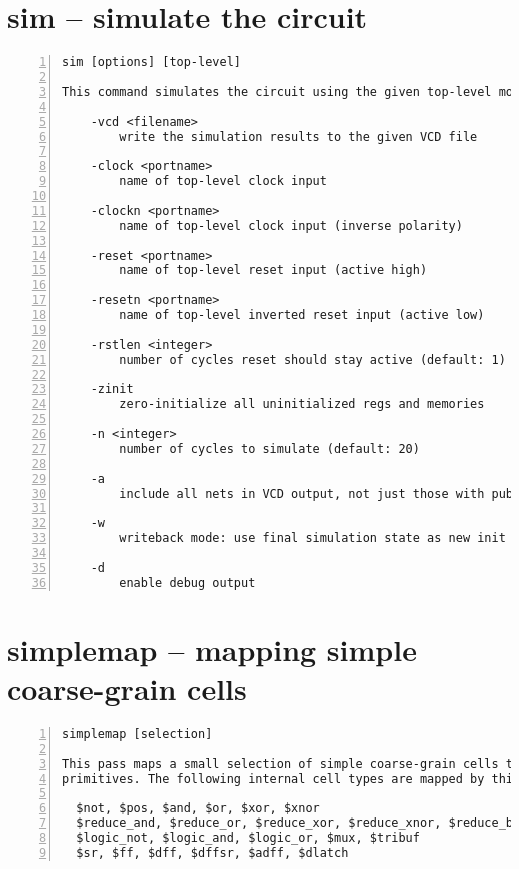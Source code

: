 \section{sim -- simulate the circuit}
\label{cmd:sim}
\begin{lstlisting}[numbers=left,frame=single]
    sim [options] [top-level]

This command simulates the circuit using the given top-level module.

    -vcd <filename>
        write the simulation results to the given VCD file

    -clock <portname>
        name of top-level clock input

    -clockn <portname>
        name of top-level clock input (inverse polarity)

    -reset <portname>
        name of top-level reset input (active high)

    -resetn <portname>
        name of top-level inverted reset input (active low)

    -rstlen <integer>
        number of cycles reset should stay active (default: 1)

    -zinit
        zero-initialize all uninitialized regs and memories

    -n <integer>
        number of cycles to simulate (default: 20)

    -a
        include all nets in VCD output, not just those with public names

    -w
        writeback mode: use final simulation state as new init state

    -d
        enable debug output
\end{lstlisting}

\section{simplemap -- mapping simple coarse-grain cells}
\label{cmd:simplemap}
\begin{lstlisting}[numbers=left,frame=single]
    simplemap [selection]

This pass maps a small selection of simple coarse-grain cells to yosys gate
primitives. The following internal cell types are mapped by this pass:

  $not, $pos, $and, $or, $xor, $xnor
  $reduce_and, $reduce_or, $reduce_xor, $reduce_xnor, $reduce_bool
  $logic_not, $logic_and, $logic_or, $mux, $tribuf
  $sr, $ff, $dff, $dffsr, $adff, $dlatch
\end{lstlisting}

